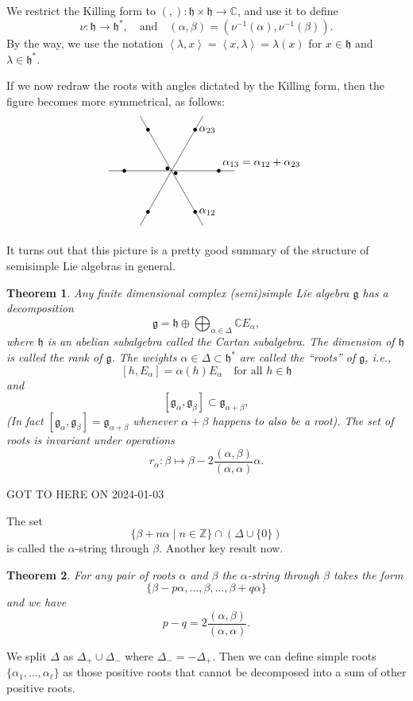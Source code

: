 \documentclass[12pt]{article}
\theoremstyle{plain}
\newtheorem{thm}{Theorem}[section]
\theoremstyle{definition}
\numberwithin{equation}{section}
\newcommand{\al}{\alpha}
\newcommand{\la}{\lambda}
\newcommand{\D}{\Delta}
\newcommand{\C}{\mathbb{C}}
\newcommand{\Z}{\mathbb{Z}}
\newcommand{\g}{\mathfrak{g}}
\newcommand{\h}{\mathfrak{h}}
\begin{document}
We restrict the Killing form to $(,) : \h \times \h \rightarrow \C$, and use it to define
\[
\nu : \h \rightarrow \h^*, \quad \text{and} \quad (\alpha, \beta) = (\nu^{-1}(\alpha), \nu^{-1}(\beta)).
\]
By the way, we use the notation $\left<\la, x\right> = \left<x, \la\right> = \la(x)$ for $x \in \h$ and $\la \in \h^*$.

If we now redraw the roots with angles dictated by the Killing form, then the figure becomes more symmetrical, as follows:
\[
\begin{tikzpicture}
	\foreach \a in {0,120,240} {
	\draw[fill] (\a:1.5cm) circle (1.5pt) (\a+180:1.5cm) circle (1.5pt);
	\draw[] (\a:2cm) -- (\a+180:2cm);
	}
	\draw[fill] (-30:0.15) circle(1.5pt) (150:0.15) circle(1.5pt);
	\node[anchor = south west] at (0:1.5cm) {$\alpha_{13} = \alpha_{12} + \alpha_{23}$};
	\node[right] at (-60:1.5cm) {$\alpha_{12}$};
	\node[right] at (60:1.5cm) {$\alpha_{23}$};
\end{tikzpicture}
\]

It turns out that this picture is a pretty good summary of the structure of semisimple Lie algebras in general.
\begin{thm}
Any finite dimensional complex (semi)simple Lie algebra $\g$ has a decomposition
\[
\g = \h \oplus \bigoplus_{\alpha \in \D} \C E_\alpha,
\]
where $\h$ is an abelian subalgebra called the Cartan subalgebra. The dimension of $\h$ is called the rank of $\g$. The weights $\alpha \in \D \subset \h^*$ are called the ``roots'' of $\g$, i.e.,
\[
[h, E_\alpha] = \al(h) E_\alpha \quad \text{for all $h \in \h$}
\]
and
\[
[\g_\alpha, \g_\beta] \subset \g_{\alpha+\beta},
\]
(In fact $[\g_\alpha, \g_\beta] = \g_{\alpha+\beta}$ whenever $\alpha+\beta$ happens to also be a root). The set of roots is invariant under operations
\[
r_\alpha : \beta \mapsto \beta - 2\frac{(\alpha, \beta)}{(\alpha, \alpha)} \alpha.
\]
\end{thm}


{\color{red}GOT TO HERE ON 2024-01-03}

The set
\[
\{\beta + n\alpha \mid n \in \Z\} \cap (\Delta \cup \{0\})
\]
is called the $\alpha$-string through $\beta$. Another key result now.
\begin{thm}
For any pair of roots $\alpha$ and $\beta$ the $\alpha$-string through $\beta$ takes the form
\[
\{\beta-p\alpha, \ldots, \beta, \ldots, \beta+q\alpha\}
\]
and we have
\[
p-q = 2\frac{(\alpha, \beta)}{(\alpha, \alpha)}.
\]
\end{thm}
We split $\Delta$ as $\Delta_+ \cup \Delta_-$ where $\Delta_- = -\Delta_+$. Then we can define simple roots $\{\al_1, \ldots, \al_\ell\}$ as those positive roots that cannot be decomposed into a sum of other positive roots.
\end{document}
